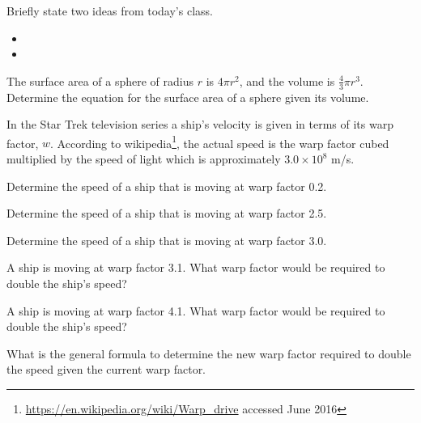 \postClass

\begin{problem}
\item Briefly state two ideas from today's class.
  \begin{itemize}
  \item
  \item
  \end{itemize}
\item The surface area of a sphere of radius $r$ is $4\pi r^2$, and
  the volume is $\frac{4}{3}\pi r^3$. Determine the equation for the
  surface area of a sphere given its volume.
\item In the Star Trek television series a ship's velocity is given in
  terms of its warp factor, $w$. According to
  wikipedia\footnote{\url{https://en.wikipedia.org/wiki/Warp_drive} accessed June 2016},
  the actual speed is the warp factor cubed multiplied by the speed of
  light which is approximately $3.0\times 10^8$ m/s.
  \begin{subproblem}
  \item Determine the speed of a ship that is moving at warp factor 0.2.
  \item Determine the speed of a ship that is moving at warp factor
    2.5.
  \item Determine the speed of a ship that is moving at warp factor
    3.0.
  \item A ship is moving at warp factor 3.1. What warp factor would be
    required to double the ship's speed?
  \item A ship is moving at warp factor 4.1. What warp factor would be
    required to double the ship's speed?
  \item What is the general formula to determine the new warp factor
    required to double the speed given the current warp factor.
  \end{subproblem}
\end{problem}


